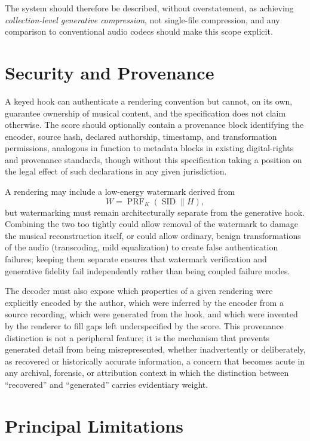 \documentclass[11pt]{article}
\DeclareMathOperator{\PRF}{PRF}
\begin{document}
The system should therefore be described, without overstatement, as achieving \emph{collection-level generative compression}, not single-file compression, and any comparison to conventional audio codecs should make this scope explicit.

\section{Security and Provenance}
\label{sec:security}

A keyed hook can authenticate a rendering convention but cannot, on its own, guarantee ownership of musical content, and the specification does not claim otherwise. The score should optionally contain a provenance block identifying the encoder, source hash, declared authorship, timestamp, and transformation permissions, analogous in function to metadata blocks in existing digital-rights and provenance standards, though without this specification taking a position on the legal effect of such declarations in any given jurisdiction.

A rendering may include a low-energy watermark derived from
\[
W=
\PRF_K(\operatorname{SID}\parallel H),
\]
but watermarking must remain architecturally separate from the generative hook. Combining the two too tightly could allow removal of the watermark to damage the musical reconstruction itself, or could allow ordinary, benign transformations of the audio (transcoding, mild equalization) to create false authentication failures; keeping them separate ensures that watermark verification and generative fidelity fail independently rather than being coupled failure modes.

The decoder must also expose which properties of a given rendering were explicitly encoded by the author, which were inferred by the encoder from a source recording, which were generated from the hook, and which were invented by the renderer to fill gaps left underspecified by the score. This provenance distinction is not a peripheral feature; it is the mechanism that prevents generated detail from being misrepresented, whether inadvertently or deliberately, as recovered or historically accurate information, a concern that becomes acute in any archival, forensic, or attribution context in which the distinction between ``recovered'' and ``generated'' carries evidentiary weight.

\section{Principal Limitations}
\end{document}
